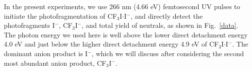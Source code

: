 \documentclass[%
aip,
rsi,
 amsmath,amssymb,
reprint,%
]{revtex4-1}
\begin{document}
In the present experiments, we use 266 nm (4.66 eV) femtosecond UV pulses to initiate the photofragmentation of CF$_3$I$\cdot$I$^-$, and directly detect the photofragments I$^-$, CF$_3$I$^-$, and total yield of neutrals, as shown in Fig.~\ref{data}. The photon energy we used here is well above the lower direct detachment energy 4.0 eV and just below the higher direct detachment energy 4.9 eV of CF$_3$I$\cdot$I$^-$. The dominant anion product is I$^-$, which we will discuss after considering the second most abundant anion product, CF$_3$I$^-$. 

\end{document}
